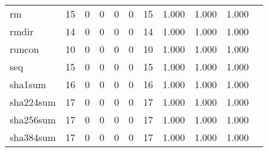 \begin{longtable}{lp{1.10cm}p{1.10cm}p{1.10cm}p{1.10cm}p{1.10cm}p{1.10cm}p{1.10cm}p{1.10cm}p{1.10cm}p{1.10cm}}
rm        &                     15 &                                  0 &                                 0 &                                0 &                                 0 &                              15 &                          1.000 &                                 1.000 &                               1.000 \\
rmdir     &                     14 &                                  0 &                                 0 &                                0 &                                 0 &                              14 &                          1.000 &                                 1.000 &                               1.000 \\
runcon    &                     10 &                                  0 &                                 0 &                                0 &                                 0 &                              10 &                          1.000 &                                 1.000 &                               1.000 \\
seq       &                     15 &                                  0 &                                 0 &                                0 &                                 0 &                              15 &                          1.000 &                                 1.000 &                               1.000 \\
sha1sum   &                     16 &                                  0 &                                 0 &                                0 &                                 0 &                              16 &                          1.000 &                                 1.000 &                               1.000 \\
sha224sum &                     17 &                                  0 &                                 0 &                                0 &                                 0 &                              17 &                          1.000 &                                 1.000 &                               1.000 \\
sha256sum &                     17 &                                  0 &                                 0 &                                0 &                                 0 &                              17 &                          1.000 &                                 1.000 &                               1.000 \\
sha384sum &                     17 &                                  0 &                                 0 &                                0 &                                 0 &                              17 &                          1.000 &                                 1.000 &                               1.000 \\

\end{longtable}
